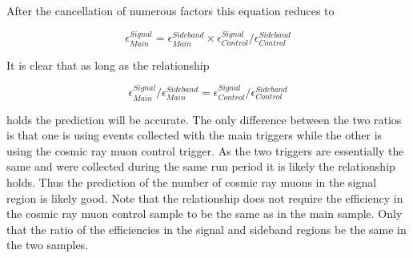 After the cancellation of numerous factors this equation reduces to 

\begin{equation}
\epsilon_{Main}^{Signal} = \epsilon_{Main}^{Sideband} \times \epsilon_{Control}^{Signal} / \epsilon_{Control}^{Sideband}
\label{eq:ReducedCosmicPred}
\end{equation}

It is clear that as long as the relationship

\begin{equation}
\epsilon_{Main}^{Signal}/ \epsilon_{Main}^{Sideband} = \epsilon_{Control}^{Signal} / \epsilon_{Control}^{Sideband}
\label{eq:ReducedCosmicPredRatio}
\end{equation}

holds the prediction will be accurate. The only difference between the two ratios is that one is using events collected with the main triggers while the
other is using the cosmic ray muon control trigger. As the two triggers are essentially the same and were collected during the same run period it is likely the
relationship holds. Thus the prediction of the number of cosmic ray muons in the signal region is likely good. Note that the relationship does not require the efficiency
in the cosmic ray muon control sample to be the same as in the main sample. Only that the ratio of the efficiencies in the signal and sideband regions
be the same in the two samples.

